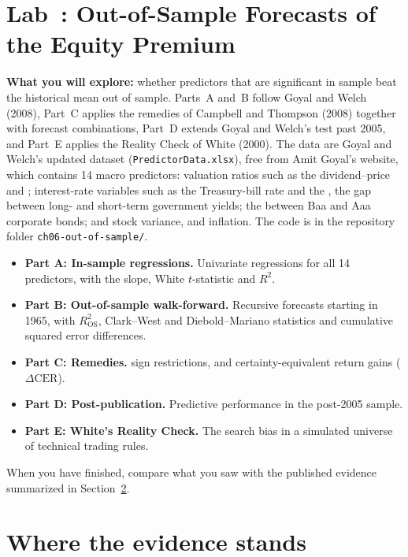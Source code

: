 \section{Lab~\thechapter: Out-of-Sample Forecasts of the Equity Premium}
\label{sec:09-lab}

\textbf{What you will explore:} whether predictors that are significant in sample beat the historical mean out of sample. Parts~A and~B follow Goyal and Welch (2008), Part~C applies the remedies of Campbell and Thompson (2008) together with forecast combinations, Part~D extends Goyal and Welch's test past 2005, and Part~E applies the Reality Check of White (2000). The data are Goyal and Welch's updated dataset (\texttt{PredictorData.xlsx}), free from Amit Goyal's website, which contains 14 macro predictors: valuation ratios such as the dividend--price and ; interest-rate variables such as the Treasury-bill rate and the , the gap between long- and short-term government yields; the  between Baa and Aaa corporate bonds; and stock variance,  and inflation. The code is in the repository folder \texttt{ch06-out-of-sample/}.

\begin{itemize}
  \item \textbf{Part A: In-sample regressions.} Univariate regressions for all 14 predictors, with the slope, White $t$-statistic and $R^2$.
  \item \textbf{Part B: Out-of-sample walk-forward.} Recursive forecasts starting in 1965, with $R^2_{\text{OS}}$, Clark--West and Diebold--Mariano statistics and cumulative squared error differences.
  \item \textbf{Part C: Remedies.}  sign restrictions,  and certainty-equivalent return gains ($\Delta \text{CER}$).
  \item \textbf{Part D: Post-publication.} Predictive performance in the post-2005 sample.
  \item \textbf{Part E: White's Reality Check.} The search bias in a simulated universe of technical trading rules.
\end{itemize}

When you have finished, compare what you saw with the published evidence summarized in Section~\ref{sec:09-verdict}.

\section{Where the evidence stands}
\label{sec:09-verdict}

